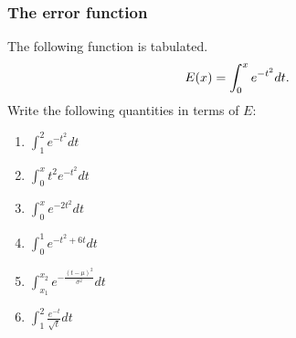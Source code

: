 \documentclass[14pt]{beamer}
\newcommand{\p}{\pause}
\newcommand{\vv}{\vspace{.2cm}}
\begin{document}
\begin{frame}[t]
\frametitle{The error function} 

The following function	is tabulated.
	\[
		{\Large E(x) =  \int_0^x e^{-t^2} dt}.
	\]
Write the following quantities in terms of $E$:

\begin{multicols}{2}
	\begin{enumerate}
		\item ${\int_1^{2} e^{-t^2} dt}$
		
		\vv
		\item ${\int_0^x t^2 e^{-t^2} dt}$
		
		\vv
		\item  ${\int_0^x e^{-2t^2} dt}$
		
		\vv
\p		\item  ${\int_0^1  e^{-t^2+6t} dt}$
		
		\vv
		\item  ${\int_{x_1}^{x_2}  e^{-\frac{(t- \mu)^2}{\sigma^2}} dt}$

		\vv
		\item  ${\int_1^2 \frac{e^{-t}}{\sqrt{t}} dt}$
	\end{enumerate}
\end{multicols}

\end{frame}
\end{document}
